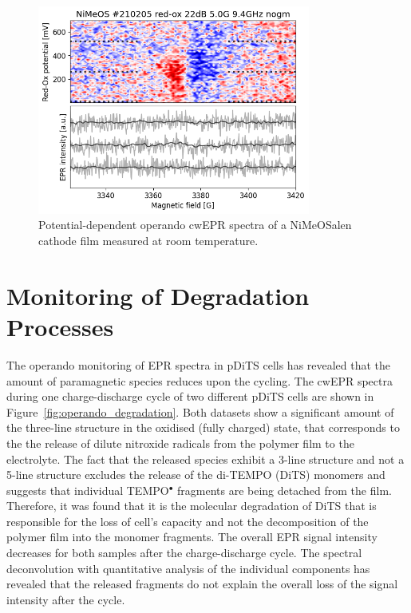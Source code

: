 \begin{figure}[!ht]
\center
	\includegraphics[width=0.8\textwidth]{./operando_epr/figures/backbone/NiMeOS_lyra_overnight_RT.png}
	\caption{Potential-dependent operando cwEPR spectra of a NiMeOSalen cathode film measured at room temperature.}
	\label{fig:cwEPR_RT_NiSalen_OPERANDO}
\end{figure}

\section{Monitoring of Degradation Processes}
The operando monitoring of EPR spectra in pDiTS cells has revealed that the amount of paramagnetic species reduces upon the cycling. The cwEPR spectra during one charge-discharge cycle of two different pDiTS cells are shown in Figure~\ref{fig:operando_degradation}. Both datasets show a significant amount of the three-line structure in the oxidised (fully charged) state, that corresponds to the the release of dilute nitroxide radicals from the polymer film to the electrolyte. The fact that the released species exhibit a 3-line structure and not a 5-line structure excludes the release of the di-TEMPO (DiTS) monomers and suggests that individual TEMPO$^{\bullet}$ fragments are being detached from the film. Therefore, it was found that it is the molecular degradation of DiTS that is responsible for the loss of cell's capacity and not the decomposition of the polymer film into the monomer fragments. The overall EPR signal intensity decreases for both samples after the charge-discharge cycle. The spectral deconvolution with quantitative analysis of the individual components has revealed that the released fragments do not explain the overall loss of the signal intensity after the cycle.\\


